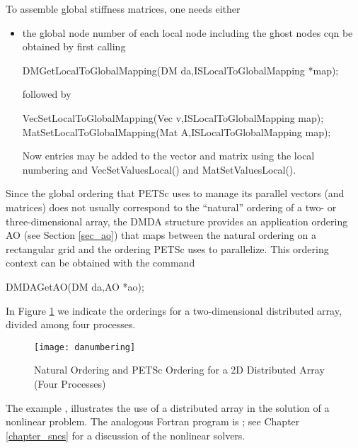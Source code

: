 To assemble global stiffness matrices, one needs either
\begin{itemize}
\item
the global node number of each local node
including the ghost nodes cqn be obtained by first calling
\begin{tabbing}
  DMGetLocalToGlobalMapping(DM da,ISLocalToGlobalMapping *map);
\end{tabbing}
followed by
\begin{tabbing}
  VecSetLocalToGlobalMapping(Vec v,ISLocalToGlobalMapping map);\\
  MatSetLocalToGlobalMapping(Mat A,ISLocalToGlobalMapping map);
\end{tabbing}
Now entries may be added to the vector and matrix using the local numbering
and VecSetValuesLocal() and MatSetValuesLocal().
\end{itemize}

Since the global ordering that PETSc uses to manage its parallel vectors
(and matrices) does not usually correspond to the ``natural'' ordering
of a two- or three-dimensional array, the DMDA structure provides
an application ordering AO (see Section \ref{sec_ao}) that maps
between the natural ordering on a rectangular grid and the ordering PETSc
uses to parallelize. This ordering context can be obtained with the command
\begin{tabbing}
  DMDAGetAO(DM da,AO *ao);
\end{tabbing}
In Figure \ref{fig_daao} we indicate the orderings for a two-dimensional distributed
array, divided among four processes.

\begin{figure}[tb]
\centerline{ \texttt{[image: danumbering]}}
\caption{Natural Ordering and PETSc Ordering for a 2D Distributed Array (Four Processes)}
\label{fig_daao}
\end{figure}

The example
,
illustrates the use of a distributed array in the solution of
a nonlinear problem.  The analogous Fortran program is
\break {};
see Chapter \ref{chapter_snes} for a discussion of the nonlinear
solvers.


